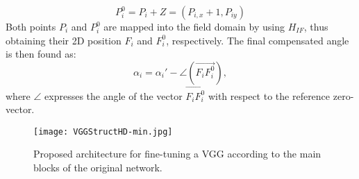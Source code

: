 \documentclass{article}
\begin{document}
\begin{equation}
    P_{i}^0 = P_{i} + Z = (P_{i,x} + 1, P_{iy})
\end{equation}
Both points $P_{i}$ and $P_{i}^0$ are mapped into the field domain by using $H_{IF}$, thus obtaining their 2D position $F_{i}$ and $F_{i}^0$, respectively.
The final compensated angle is then found as: 
\begin{equation}
    \alpha_{i} = \alpha_{i}'-\angle(\overrightarrow{F_{i}F_{i}^0}),
\end{equation}
where $\angle$ expresses the angle of the vector $\overrightarrow{F_{i}F_{i}^0}$ with respect to the reference zero-vector.


\begin{figure*}
\begin{center}
  \texttt{[image: VGGStructHD-min.jpg]}
  \caption{Proposed architecture for fine-tuning a VGG according to the main blocks of the original network.}
  \label{fig:vgg}
 \end{center}
\end{figure*}
\end{document}
